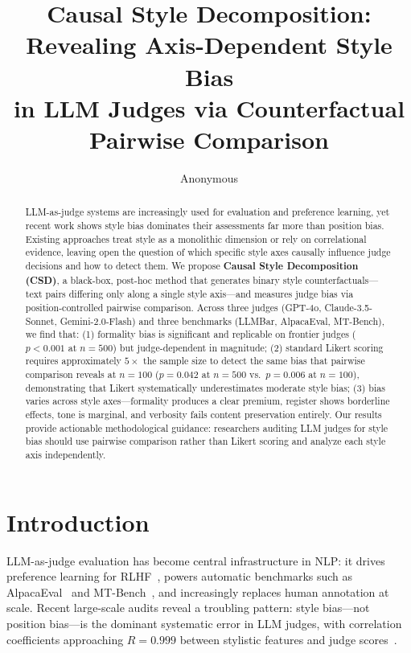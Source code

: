 \documentclass[11pt,a4paper]{article}
\title{Causal Style Decomposition: Revealing Axis-Dependent Style Bias\\in LLM Judges via Counterfactual Pairwise Comparison}
\author{Anonymous}
\begin{document}
\maketitle

\begin{abstract}
LLM-as-judge systems are increasingly used for evaluation and preference learning, yet recent work shows style bias dominates their assessments far more than position bias.
Existing approaches treat style as a monolithic dimension or rely on correlational evidence, leaving open the question of which specific style axes causally influence judge decisions and how to detect them.
We propose \textbf{Causal Style Decomposition (CSD)}, a black-box, post-hoc method that generates binary style counterfactuals---text pairs differing only along a single style axis---and measures judge bias via position-controlled pairwise comparison.
Across three judges (GPT-4o, Claude-3.5-Sonnet, Gemini-2.0-Flash) and three benchmarks (LLMBar, AlpacaEval, MT-Bench), we find that:
(1) formality bias is significant and replicable on frontier judges ($p{<}0.001$ at $n{=}500$) but judge-dependent in magnitude;
(2) standard Likert scoring requires approximately $5{\times}$ the sample size to detect the same bias that pairwise comparison reveals at $n{=}100$ ($p{=}0.042$ at $n{=}500$ vs.\ $p{=}0.006$ at $n{=}100$), demonstrating that Likert systematically underestimates moderate style bias;
(3) bias varies across style axes---formality produces a clear premium, register shows borderline effects, tone is marginal, and verbosity fails content preservation entirely.
Our results provide actionable methodological guidance: researchers auditing LLM judges for style bias should use pairwise comparison rather than Likert scoring and analyze each style axis independently.
\end{abstract}

\section{Introduction}
\label{sec:intro}

LLM-as-judge evaluation has become central infrastructure in NLP: it drives preference learning for RLHF~\cite{ouyang2022training}, powers automatic benchmarks such as AlpacaEval~\cite{dubois2024length} and MT-Bench~\cite{zheng2024judging}, and increasingly replaces human annotation at scale.
Recent large-scale audits reveal a troubling pattern: style bias---not position bias---is the dominant systematic error in LLM judges, with correlation coefficients approaching $R{=}0.999$ between stylistic features and judge scores~\cite{sosbench2025,raina2024llm}.
\end{document}

